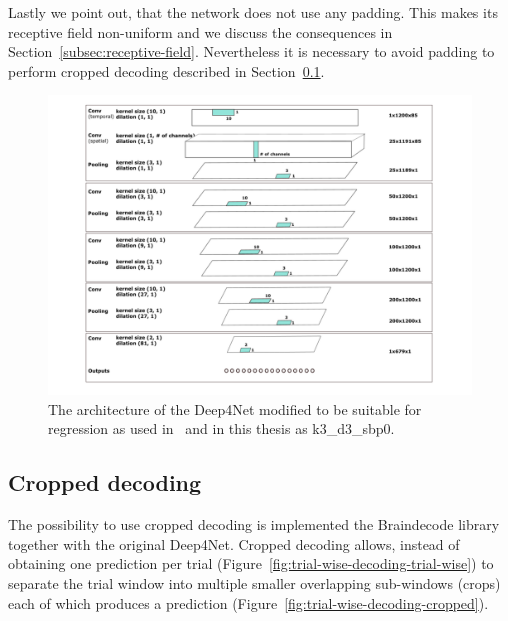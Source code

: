 Lastly we point out, that the network does not use any padding. 
This makes its receptive field non-uniform and we discuss the consequences in Section~\ref{subsec:receptive-field}.
Nevertheless it is necessary to avoid padding to perform cropped decoding described in Section~\ref{subsec:cropped-decoding}.

\begin{figure}[!htbp]
\centering
\includegraphics[width=\linewidth]{img/ch3/architektura}
\caption[Deep4Net architecture]{The architecture of the Deep4Net modified to be suitable for regression as used in~\cite{Hammer-2021} and in this thesis as k3\_d3\_sbp0.}
\label{fig:architecture}
\end{figure}

\subsection{Cropped decoding}\label{subsec:cropped-decoding}
The possibility to use cropped decoding is implemented the Braindecode library together with the original Deep4Net.
Cropped decoding allows, instead of obtaining one prediction per trial (Figure~\ref{fig:trial-wise-decoding-trial-wise}) to separate the trial window into multiple smaller overlapping sub-windows (crops) each of which produces a prediction (Figure~\ref{fig:trial-wise-decoding-cropped}).


